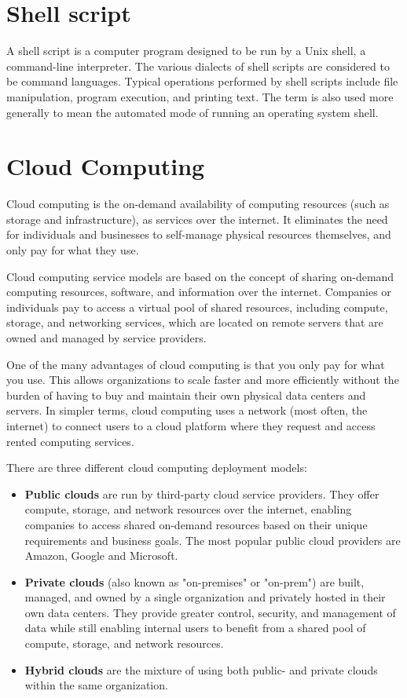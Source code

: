 \section{Shell script}
	A shell script \cite{shellscript} is a computer program designed to be run by a Unix shell, a command-line interpreter. The various dialects of shell scripts 
	are considered to be command languages. Typical operations performed by shell scripts include file manipulation, program execution, and printing text.
	The term is also used more generally to mean the automated mode of running an operating system shell.

\section{Cloud Computing}
	Cloud computing \cite{cloud} is the on-demand availability of computing resources (such as storage and infrastructure), as services over the internet. 
	It eliminates the need for individuals and businesses to self-manage physical resources themselves, and only pay for what they use.

	Cloud computing service models are based on the concept of sharing on-demand computing resources, software, and information over the internet. 
	Companies or individuals pay to access a virtual pool of shared resources, including compute, storage, and networking services, which are located on
	remote servers that are owned and managed by service providers. 

	One of the many advantages of cloud computing is that you only pay for what you use. This allows organizations to scale faster and more efficiently 
	without the burden of having to buy and maintain their own physical data centers and servers.  
	In simpler terms, cloud computing uses a network (most often, the internet) to connect users to a cloud platform where they request and access 
	rented computing services.

	There are three different cloud computing deployment models:
	\begin{itemize}
		\item \textbf{Public clouds} are run by third-party cloud service providers. They offer compute, storage, and network resources over the internet, 
		enabling companies to access shared on-demand resources based on their unique requirements and business goals.
		The most popular public cloud providers are Amazon, Google and Microsoft.
		\item \textbf{Private clouds} (also known as "on-premises" or "on-prem") are built, managed, and owned by a single organization 
		and privately hosted in their own data centers.
		They provide greater control, security, and management of data while still 
		enabling internal users to benefit from a shared pool of compute, storage, and network resources.
		\item \textbf{Hybrid clouds} are the mixture of using both public- and private clouds within the same organization.
	\end{itemize}


